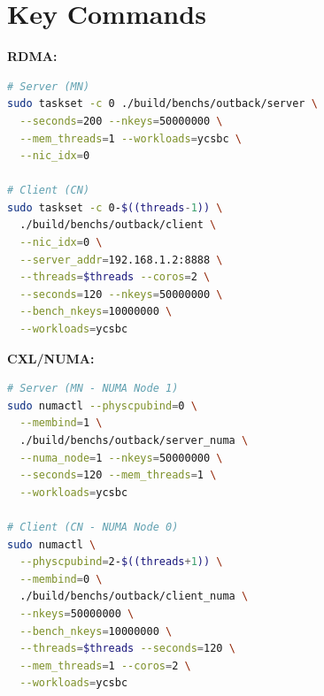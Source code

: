 \documentclass[conference]{IEEEtran}
\begin{document}
\begin{table}[H]
\centering
\caption{Files created/modified for the CXL/NUMA port}
\label{tab:files}
\scriptsize
{}
\end{table}

\section{Key Commands}

\textbf{RDMA:}
\begin{lstlisting}[language=bash,basicstyle=\ttfamily\scriptsize]
# Server (MN)
sudo taskset -c 0 ./build/benchs/outback/server \
  --seconds=200 --nkeys=50000000 \
  --mem_threads=1 --workloads=ycsbc \
  --nic_idx=0

# Client (CN)
sudo taskset -c 0-$((threads-1)) \
  ./build/benchs/outback/client \
  --nic_idx=0 \
  --server_addr=192.168.1.2:8888 \
  --threads=$threads --coros=2 \
  --seconds=120 --nkeys=50000000 \
  --bench_nkeys=10000000 \
  --workloads=ycsbc
\end{lstlisting}

\textbf{CXL/NUMA:}
\begin{lstlisting}[language=bash,basicstyle=\ttfamily\scriptsize]
# Server (MN - NUMA Node 1)
sudo numactl --physcpubind=0 \
  --membind=1 \
  ./build/benchs/outback/server_numa \
  --numa_node=1 --nkeys=50000000 \
  --seconds=120 --mem_threads=1 \
  --workloads=ycsbc

# Client (CN - NUMA Node 0)
sudo numactl \
  --physcpubind=2-$((threads+1)) \
  --membind=0 \
  ./build/benchs/outback/client_numa \
  --nkeys=50000000 \
  --bench_nkeys=10000000 \
  --threads=$threads --seconds=120 \
  --mem_threads=1 --coros=2 \
  --workloads=ycsbc
\end{lstlisting}
\end{document}
